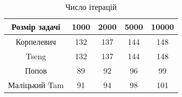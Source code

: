 \begin{table}[H]
	\centering
	\begin{tabular}{|c||c|c|c|c|}\hline
		Розмір задачі & 1000 & 2000 & 5000 & 10000 \\ \hline \hline
		Корпелевич & 132 & 137 & 144 & 148 \\ \hline
		Tseng & 132 & 137 & 144 & 148 \\ \hline
		Попов & 89 & 92 & 96 & 99 \\ \hline
		Маліцький Tam & 91 & 94 & 98 & 101 \\ \hline
	\end{tabular}
	\caption{Число ітерацій}
\end{table}
